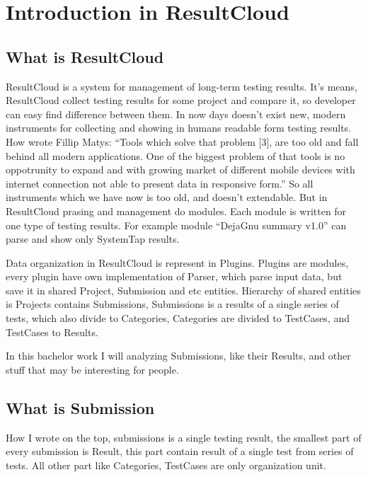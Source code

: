
\chapter{Introduction in ResultCloud}
\section{What is ResultCloud}

ResultCloud is a system for management of long-term testing results. It's means, ResultCloud collect testing results for some project and compare it, so developer can easy find difference between them. In now days doesn't exist new, modern instruments for collecting and showing in humans readable form testing results. How wrote Fillip Matys: “Tools which solve that problem [3], are too old and fall behind all modern applications. One of the biggest problem of that tools is no oppotrunity to expand and with growing market of different mobile devices with internet connection not able to present data in responsive form.” So all instruments which we have now is too old, and doesn't extendable. But in ResultCloud prasing and management do modules. Each module is written for one type of testing results. For example module “DejaGnu summary v1.0” can parse and show only SystemTap results. 

Data organization in ResultCloud is represent in Plugins. Plugins are modules, every plugin have own implementation of Parser, which parse input data, but save it in shared Project, Submission and etc entities. Hierarchy of shared entities is Projects  contains Submissions, Submissions is a results of a single series of tests, which also divide to Categories, Categories are divided to TestCases, and TestCases to Results.

In this bachelor work I will analyzing Submissions, like their Results, and other stuff that may be interesting for people.

\section{What is Submission}

How I wrote on the top, submissions is a single testing result, the smallest part of every submission is Result, this part contain result of a single test from series of tests. All other part like Categories, TestCases are only organization unit. 

